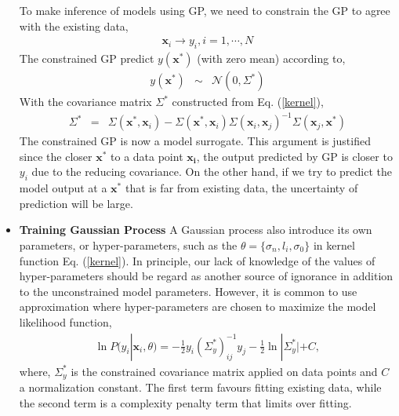 \documentclass[aps,prl,twocolumn,groupedaddress]{revtex4-1}
\begin{document}
\begin{itemize}
	 To make inference of models using GP, we need to constrain the GP to agree with the existing data,
	 \begin{eqnarray}
	 		\mathbf{x}_i \rightarrow y_i, i = 1, \cdots, N
	 \end{eqnarray}
	 The constrained GP predict $y(\mathbf{x}^*)$ (with zero mean) according to,
	 \begin{eqnarray}
	 	y(\mathbf{x}^*) &\sim& \mathcal{N}\left(0, \Sigma^*\right)
	 \end{eqnarray}
	 With the covariance matrix $\Sigma^*$ constructed from Eq. (\ref{kernel}),
	 \begin{eqnarray}
	 	\Sigma^* &=& \Sigma(\mathbf{x}^*, \mathbf{x}_i) -  \Sigma(\mathbf{x}^*, \mathbf{x}_i) \Sigma(\mathbf{x}_i, \mathbf{x}_j)^{-1} \Sigma(\mathbf{x}_j, \mathbf{x}^*)
	 \end{eqnarray}
	 The constrained GP is now a model surrogate. This argument is justified since the closer $\mathbf{x}^*$ to a data point $\mathbf{x_i}$, the output predicted by GP is closer to $y_i$ due to the reducing covariance. On the other hand, if we try to predict the model output at a $\mathbf{x}^*$ that is far from existing data, the uncertainty of prediction will be large.

	\item{\bf Training Gaussian Process}
	A Gaussian process also introduce its own parameters, or hyper-parameters, such as the $\theta = \{\sigma_n, l_i, \sigma_0\}$ in kernel function Eq. (\ref{kernel}). In principle, our lack of knowledge of the values of hyper-parameters should be regard as another source of ignorance in addition to the unconstrained model parameters. However, it is common to use approximation where hyper-parameters are chosen to maximize the model likelihood function,
	\begin{eqnarray}
		\ln P(y_i|\mathbf{x}_i, \theta) = -\frac{1}{2}y_i (\Sigma_y^*)^{-1}_{ij} y_j - \frac{1}{2}\ln|\Sigma_y^*| + C,
	\end{eqnarray}
	where, $\Sigma_y^*$ is the constrained covariance matrix applied on data points and $C$ a normalization constant. The first term favours fitting existing data, while the second term is a complexity penalty term that limits over fitting.
	

\end{itemize}
\end{document}
